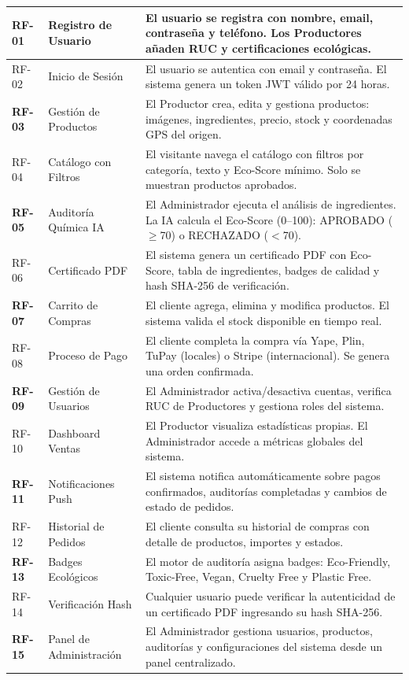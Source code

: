 \documentclass[12pt,a4paper]{article}
\begin{document}
\begin{center}
\begin{longtable}{|C{1.6cm}|L{4cm}|L{8.4cm}|}
\textbf{RF-01} & Registro de Usuario &
El usuario se registra con nombre, email, contrase\~na y tel\'efono. Los
Productores a\~naden RUC y certificaciones ecol\'ogicas. \\
\hline
RF-02 & Inicio de Sesi\'on &
El usuario se autentica con email y contrase\~na. El sistema genera un
token JWT v\'alido por 24 horas. \\
\hline
{}
\textbf{RF-03} & Gesti\'on de Productos &
El Productor crea, edita y gestiona productos: im\'agenes, ingredientes,
precio, stock y coordenadas GPS del origen. \\
\hline
RF-04 & Cat\'alogo con Filtros &
El visitante navega el cat\'alogo con filtros por categor\'ia, texto y
Eco-Score m\'inimo. Solo se muestran productos aprobados. \\
\hline
{}
\textbf{RF-05} & Auditor\'ia Qu\'imica IA &
El Administrador ejecuta el an\'alisis de ingredientes. La IA calcula el
Eco-Score (0--100): APROBADO ($\geq$70) o RECHAZADO ($<$70). \\
\hline
RF-06 & Certificado PDF &
El sistema genera un certificado PDF con Eco-Score, tabla de ingredientes,
badges de calidad y hash SHA-256 de verificaci\'on. \\
\hline
{}
\textbf{RF-07} & Carrito de Compras &
El cliente agrega, elimina y modifica productos. El sistema valida el
stock disponible en tiempo real. \\
\hline
RF-08 & Proceso de Pago &
El cliente completa la compra v\'ia Yape, Plin, TuPay (locales) o Stripe
(internacional). Se genera una orden confirmada. \\
\hline
{}
\textbf{RF-09} & Gesti\'on de Usuarios &
El Administrador activa/desactiva cuentas, verifica RUC de Productores
y gestiona roles del sistema. \\
\hline
RF-10 & Dashboard Ventas &
El Productor visualiza estad\'isticas propias. El Administrador accede
a m\'etricas globales del sistema. \\
\hline
{}
\textbf{RF-11} & Notificaciones Push &
El sistema notifica autom\'aticamente sobre pagos confirmados, auditor\'ias
completadas y cambios de estado de pedidos. \\
\hline
RF-12 & Historial de Pedidos &
El cliente consulta su historial de compras con detalle de productos,
importes y estados. \\
\hline
{}
\textbf{RF-13} & Badges Ecol\'ogicos &
El motor de auditor\'ia asigna badges: Eco-Friendly, Toxic-Free, Vegan,
Cruelty Free y Plastic Free. \\
\hline
RF-14 & Verificaci\'on Hash &
Cualquier usuario puede verificar la autenticidad de un certificado PDF
ingresando su hash SHA-256. \\
\hline
{}
\textbf{RF-15} & Panel de Administraci\'on &
El Administrador gestiona usuarios, productos, auditor\'ias y configuraciones
del sistema desde un panel centralizado. \\
\hline
\end{longtable}
\end{center}
\end{document}
